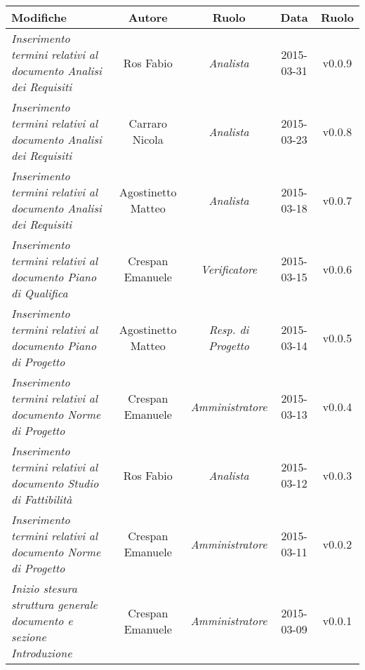 \newpage

\begin{table}[h]
\centering
\begin{tabular}{|p{}|c|c|c|c|}
	\toprule
		\textbf{Modifiche} & \textbf{Autore} & \textbf{Ruolo} & \textbf{Data} & \textbf{Ruolo} \\
	\midrule
	\midrule
		\textit{Inserimento termini relativi al documento Analisi dei Requisiti} & Ros Fabio & \textit{Analista} & 2015-03-31 & v0.0.9 \\
	\midrule
		\textit{Inserimento termini relativi al documento Analisi dei Requisiti} & Carraro Nicola & \textit{Analista} & 2015-03-23 & v0.0.8 \\
	\midrule
		\textit{Inserimento termini relativi al documento Analisi dei Requisiti} & Agostinetto Matteo & \textit{Analista} & 2015-03-18 & v0.0.7 \\
	\midrule
		\textit{Inserimento termini relativi al documento Piano di Qualifica} & Crespan Emanuele & \textit{Verificatore} & 2015-03-15 & v0.0.6 \\
	\midrule
		\textit{Inserimento termini relativi al documento Piano di Progetto} & Agostinetto Matteo & \textit{Resp. di Progetto} & 2015-03-14 & v0.0.5 \\
	\midrule
		\textit{Inserimento termini relativi al documento Norme di Progetto} & Crespan Emanuele & \textit{Amministratore} & 2015-03-13 & v0.0.4 \\
	\midrule
		\textit{Inserimento termini relativi al documento Studio di Fattibilità} & Ros Fabio & \textit{Analista} & 2015-03-12 & v0.0.3 \\
	\midrule
		\textit{Inserimento termini relativi al documento Norme di Progetto} & Crespan Emanuele & \textit{Amministratore} & 2015-03-11 & v0.0.2 \\	                         
	\midrule
		\textit{Inizio stesura struttura generale documento e sezione Introduzione} & Crespan Emanuele & \textit{Amministratore} & 2015-03-09 & v0.0.1 \\
	\bottomrule
\end{tabular}	
\end{table}

\newpage